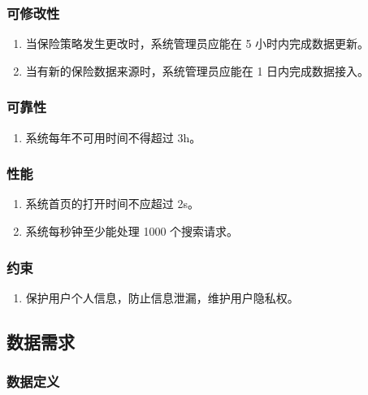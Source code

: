 \documentclass[a4paper]{ctexart}
\begin{document}
\subsubsection{可修改性}

\begin{enumerate}[label=Modifiability\arabic*.]
  \item 当保险策略发生更改时，系统管理员应能在 5 小时内完成数据更新。
  \item 当有新的保险数据来源时，系统管理员应能在 1 日内完成数据接入。
\end{enumerate}

\subsubsection{可靠性}

\begin{enumerate}[label=Reliability\arabic*.]
  \item 系统每年不可用时间不得超过 3h。
\end{enumerate}

\subsubsection{性能}

\begin{enumerate}[label=Performance\arabic*.]
  \item 系统首页的打开时间不应超过 2s。
  \item 系统每秒钟至少能处理 1000 个搜索请求。
\end{enumerate}

\subsubsection{约束}

\begin{enumerate}[label=IC\arabic*.]
  \item 保护用户个人信息，防止信息泄漏，维护用户隐私权。
\end{enumerate}

\subsection{数据需求}

\subsubsection{数据定义}
\end{document}
